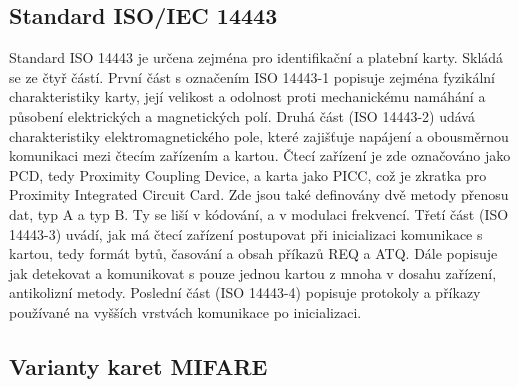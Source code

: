 \subsection{Standard ISO/IEC 14443}
Standard ISO 14443 je určena zejména pro identifikační a platební karty. Skládá se ze čtyř částí. První část s označením {ISO 14443-1} popisuje zejména fyzikální charakteristiky karty, její velikost a odolnost proti mechanickému namáhání a působení elektrických a magnetických polí. Druhá část ({ISO 14443-2}) udává charakteristiky elektromagnetického pole, které zajišťuje napájení a obousměrnou komunikaci mezi čtecím zařízením a kartou. Čtecí zařízení je zde označováno jako PCD, tedy Proximity Coupling Device, a karta jako PICC, což je zkratka pro Proximity Integrated Circuit Card. Zde jsou také definovány dvě metody přenosu dat, typ A a typ B. Ty se liší v kódování, a v modulaci frekvencí. Třetí část ({ISO 14443-3}) uvádí, jak má čtecí zařízení postupovat při inicializaci komunikace s kartou, tedy formát bytů, časování a obsah příkazů REQ a ATQ. Dále popisuje jak detekovat a komunikovat s pouze jednou kartou z mnoha v dosahu zařízení, antikolizní metody. Poslední část ({ISO 14443-4})  popisuje protokoly a příkazy používané na vyšších vrstvách komunikace po inicializaci\cite{ISO14443}.

\subsection{Varianty karet MIFARE}

